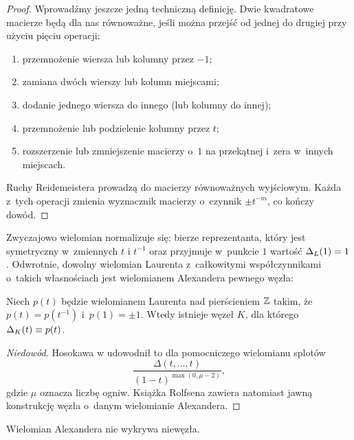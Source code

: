 \begin{proof}
    Wprowadźmy jeszcze jedną techniczną definicję.
    Dwie kwadratowe macierze będą dla nas równoważne, jeśli można przejść od jednej do drugiej przy użyciu pięciu operacji:
    \begin{enumerate}
        \item przemnożenie wiersza lub kolumny przez $-1$;
        \item zamiana dwóch wierszy lub kolumn miejscami;
        \item dodanie jednego wiersza do innego (lub kolumny do innej);
        \item przemnożenie lub podzielenie kolumny przez $t$;
        \item rozszerzenie lub zmniejszenie macierzy o~$1$ na przekątnej i~zera w~innych miejscach.
    \end{enumerate}

    Ruchy Reidemeistera prowadzą do macierzy równoważnych wyjściowym.
    Każda z~tych operacji zmienia wyznacznik macierzy o~czynnik $\pm t^{-m}$, co kończy dowód.
\end{proof}

Zwyczajowo wielomian normalizuje się: bierze reprezentanta, który jest symetryczny w~zmiennych $t$ i $t^{-1}$ oraz przyjmuje w~punkcie $1$ wartość $\Delta_L(1) = 1$.
Odwrotnie, dowolny wielomian Laurenta z~całkowitymi współczynnikami o~takich własnościach jest wielomianem Alexandera pewnego węzła:

\begin{proposition}
\label{prp:alexander_hosokawa}%
    Niech $p(t)$ będzie wielomianem Laurenta nad pierścieniem $\mathbb Z$ takim, że $p(t) = p(t^{-1})$ i~$p(1) = \pm 1$.
    Wtedy istnieje węzeł $K$, dla którego $\Delta_K(t) \equiv p(t)$.
\end{proposition}

\begin{proof}[Niedowód]
%
    Hosokawa w \cite{hosokawa58} udowodnił to dla pomocniczego wielomianu splotów
    \begin{equation}
        \frac{\Delta(t, \ldots, t)}{(1-t)^{\max(0, \mu - 2)}},
    \end{equation}
    gdzie $\mu$ oznacza liczbę ogniw.
    Książka Rolfsena \cite[s. 171-172]{rolfsen76} zawiera natomiast jawną konstrukcję węzła o~danym wielomianie Alexandera.
\end{proof}

\begin{proposition}
\label{alexander_no_detects_unknot}%
    Wielomian Alexandera nie wykrywa niewęzła.
\end{proposition}

